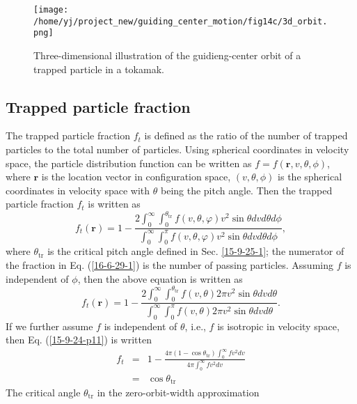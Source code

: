 \documentclass{article}
\newcommand{\tmop}[1]{\ensuremath{\operatorname{#1}}}
\begin{document}
\begin{figure}[h]
\texttt{[image: /home/yj/project\_new/guiding\_center\_motion/fig14c/3d\_orbit.png]}
  \caption{Three-dimensional illustration of the guidieng-center orbit of a
  trapped particle in a tokamak.}
\end{figure}

\subsection{Trapped particle fraction}

The trapped particle fraction $f_t$ is defined as the ratio of the number of
trapped particles to the total number of particles. Using spherical
coordinates in velocity space, the particle distribution function can be
written as $f = f (\mathbf{r}, v, \theta, \phi)$, where $\mathbf{r}$ is the
location vector in configuration space, $(v, \theta, \phi)$ is the spherical
coordinates in velocity space with $\theta$ being the pitch angle. Then the
trapped particle fraction $f_t$ is written as
\begin{equation}
  \label{16-6-29-1} f_t (\mathbf{r}) = 1 - \frac{2 \int_0^{\infty}
  \int_0^{\theta_{\tmop{tr}}} f (v, \theta, \varphi) v^2 \sin \theta d v d
  \theta d \phi}{\int_0^{\infty} \int_0^{\pi} f (v, \theta, \varphi) v^2 \sin
  \theta d v d \theta d \phi},
\end{equation}
where $\theta_{\tmop{tr}}$ is the critical pitch angle defined in Sec.
\ref{15-9-25-1}; the numerator of the fraction in Eq. (\ref{16-6-29-1}) is the
number of passing particles. Assuming $f$ is independent of $\phi$, then the
above equation is written as
\begin{equation}
  \label{15-9-24-p11} f_t (\mathbf{r}) = 1 - \frac{2 \int_0^{\infty}
  \int_0^{\theta_{\tmop{tr}}} f (v, \theta) 2 \pi v^2 \sin \theta d v d
  \theta}{\int_0^{\infty} \int_0^{\pi} f (v, \theta) 2 \pi v^2 \sin \theta d v
  d \theta} .
\end{equation}
If we further assume $f$ is independent of $\theta$, i.e., $f$ is isotropic in
velocity space, then Eq. (\ref{15-9-24-p11}) is written
\begin{eqnarray}
  f_t & = & 1 - \frac{4 \pi (1 - \cos \theta_{\tmop{tr}}) \int_0^{\infty} f
  v^2 d v}{4 \pi \int_0^{\infty} f v^2 d v} \nonumber\\
  & = & \cos \theta_{\tmop{tr}}  \label{15-9-24-p13}
\end{eqnarray}
The critical angle $\theta_{\tmop{tr}}$ in the zero-orbit-width approximation
\end{document}
